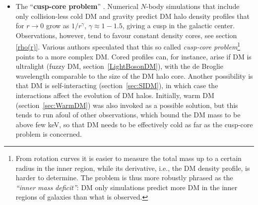 \begin{itemize}
\item[$\blacktriangleright$] The ``{\bf cusp-core problem}'' \cite{corecusp}. Numerical $N$-body simulations that include only collision-less cold DM and gravity predict DM halo density profiles that for $r\to 0$ grow as $1/r^\gamma$, $\gamma\approx 1 -1.5$, giving a cusp in the galactic center. Observations, however, tend to favour constant density cores, see section \ref{rho(r)}. 
Various authors speculated that this so called {\em cusp-core problem}\footnote{From rotation curves it is easier to measure the total mass up to a certain radius in the inner region, while its derivative, i.e., the DM density profile, is harder to determine. The problem is thus more robustly phrased as the {\em ``inner mass deficit''}: DM only simulations predict more DM in the inner regions of galaxies than what is observed.} points to a more complex DM.
Cored profiles can, for instance, arise if DM is ultralight (fuzzy DM, section~\ref{LightBosonDM}), with the de Broglie wavelength comparable to the size of the DM halo core. Another possibility is that DM is self-interacting (section~\ref{sec:SIDM}), in which case the interactions affect the evolution of DM halos. Initially, warm DM (section~\ref{sec:WarmDM}) was also invoked as a possible solution, but this tends to run afoul of other observations, which bound the DM mass to be above few keV, so that DM needs to be effectively cold as far as the cusp-core problem is concerned. 


\end{itemize}

